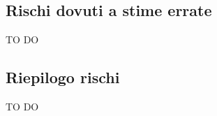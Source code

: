 	\subsection{Rischi dovuti a stime errate} %
	\label{sub:rischi_dovuti_a_stime_errate}
	TO DO
	
	\subsection{Riepilogo rischi} %
	\label{sub:riepilogo_rischi}
	TO DO
	
